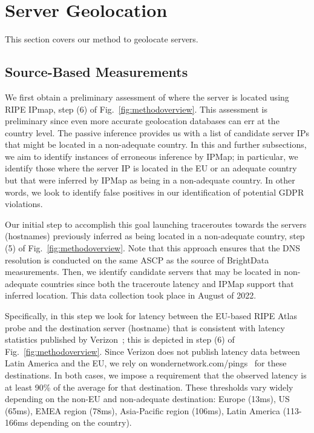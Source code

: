 \section{Server Geolocation}
\label{sec:servergeolocation}
This section covers our method to geolocate servers.

\subsection{Source-Based Measurements}
\label{sec:source-based}


We first obtain a preliminary assessment of where the server is located using RIPE IPmap,
step (6) of Fig.~\ref{fig:methodoverview}. %
This assessment is preliminary since even more accurate geolocation databases can err at the country level.
The passive inference %
provides us with a list of candidate server IPs that
might be located in a non-adequate country.
In this and further subsections, we aim to
identify instances of erroneous inference by IPMap;
in particular, we identify those where the server IP
is located in the EU or an adequate country but that were inferred by IPMap
as being in a non-adequate country. In other words, we look to identify false positives
in our identification of potential GDPR violations.

Our initial step to accomplish this goal
launching traceroutes towards the servers
(hostnames) previously inferred as being located in a non-adequate country,
step (5) of Fig.~\ref{fig:methodoverview}.
Note that this approach ensures that the DNS resolution is conducted 
on the same ASCP as the source of BrightData measurements.
Then, we identify candidate servers that may be located in non-adequate countries since
both the traceroute latency and IPMap support that inferred location.
This data collection took place in August of 2022.

Specifically, in this step we look for latency between the EU-based
RIPE Atlas probe and the destination server (hostname)
that is consistent with latency statistics published by Verizon~\cite{MonthlyI86:online};
this is depicted in step (6) of Fig.~\ref{fig:methodoverview}.
Since Verizon does not publish latency data between Latin America and the EU, we
rely on wondernetwork.com/pings~\cite{GlobalPi56:online} for these destinations.
In both cases, we impose a requirement that the observed latency is at least 90\%
of the average for that destination. These thresholds vary widely depending on 
the non-EU and non-adequate destination: Europe (13ms), US (65ms), EMEA region (78ms), 
Asia-Pacific region (106ms), Latin America (113-166ms depending on the country).


